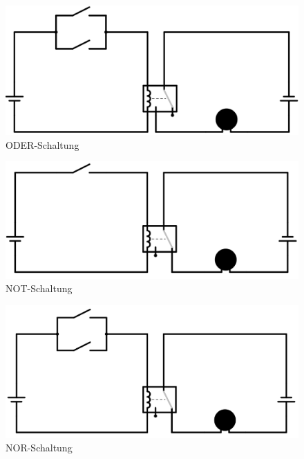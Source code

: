 \documentclass[10pt, oneside]{article}
\begin{document}
\begin{figure}[p]
    \includegraphics[width=1\textwidth]{./assets/oder-circuit.png}
    \caption{ODER-Schaltung}
    \label{fig:oder-circuit}
\end{figure}

\FloatBarrier

 \begin{figure}[p]
    \includegraphics[width=1\textwidth]{./assets/not-circuit.png}
    \caption{NOT-Schaltung}
    \label{fig:not-circuit}
\end{figure}

\begin{figure}[p]
    \includegraphics[width=1\textwidth]{./assets/nor-circuit.png}
    \caption{NOR-Schaltung}
    \label{fig:nor-circuit}
\end{figure}

\FloatBarrier
\end{document}
